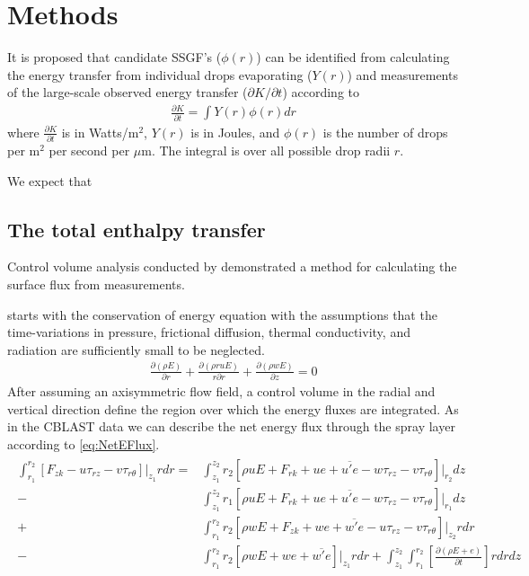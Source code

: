 \documentclass[10pt,a4paper]{article}
\begin{document}
\section{Methods}
It is proposed that  candidate SSGF's ($\phi(r)$) can be identified from calculating the energy transfer from individual drops evaporating ($Y(r)$) and measurements of the large-scale observed energy transfer ($\partial K /\partial t$) according to
\begin{align}
\frac{\partial K}{\partial t} = \int Y(r)\phi(r) dr\label{eq:Kdt}
\end{align}
where $\frac{\partial K}{\partial t}$ is in Watts/m$^2$, $Y(r)$ is in Joules, and $\phi(r)$ is the number of drops per m$^2$ per second per $\mu$m. The integral is over all possible drop radii $r$.\par 
We expect that 

\subsection{The total enthalpy transfer}
Control volume analysis conducted by \citet{Bell2012} demonstrated a method for calculating the surface flux from measurements. \par
\citet{Bell2012} starts with the conservation of energy equation with the assumptions that the time-variations in pressure, frictional diffusion, thermal conductivity, and radiation are sufficiently small to be neglected.
\begin{align}
 \frac{\partial (\rho E)}{\partial r} + \frac{\partial (\rho r u E)}{r \partial r}+ \frac{\partial (\rho w E)}{\partial z}=0
\end{align}
After assuming an axisymmetric flow field, a control volume in the radial and vertical direction define the region over which the energy fluxes are integrated. As in \citet{Bell2012} the CBLAST data we can describe the net energy flux through the spray layer according to \ref{eq:NetEFlux}.
\begin{align}
\begin{split}
\int_{r_1}^{r_2} [F_{zk}- u\tau_{rz} - v\tau_{r\theta}]\bigg\rvert_{z_1}rdr =& \int_{z_1}^{z_2} r_2[\rho u E + F_{rk} + ue + \overline{u'e} - w\tau_{rz} - v\tau_{r\theta}]\bigg\rvert_{r_2}dz\\
-& \int_{z_1}^{z_2} r_1[\rho u E + F_{rk} + ue + \overline{u'e} - w\tau_{rz} - v\tau_{r\theta}]\bigg\rvert_{r_1}dz\\
+& \int_{r_1}^{r_2} r_2[\rho w E + F_{zk} + we + \overline{w'e} - u\tau_{rz} - v\tau_{r\theta}]\bigg\rvert_{z_2}rdr\\
-& \int_{r_1}^{r_2} r_2[\rho w E + we + \overline{w'e} ]\bigg\rvert_{z_1}rdr + \int_{z_1}^{z_2}\int_{r_1}^{r_2}\left[\frac{\partial (\rho E + e)}{\partial t}\right]rdrdz\\\label{eq:NetEFlux}
\end{split}
\end{align}
\end{document}
